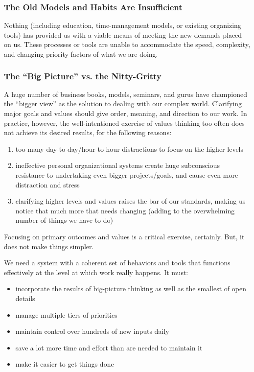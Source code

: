 \documentclass[letterpaper]{article}
\newcommand{\p}{\vspace{1em}\par}		%
\begin{document}
\subsubsection*{The Old Models and Habits Are Insufficient}
Nothing (including education, time-management models, or existing organizing tools) has provided us with a viable means of meeting the new demands placed on us. These processes or tools are unable to accommodate the speed, complexity, and changing priority factors of what we are doing.

\subsubsection*{The ``Big Picture'' vs. the Nitty-Gritty}
A huge number of business books, models, seminars, and gurus have championed the ``bigger view'' as the solution to dealing with our complex world. Clarifying major goals and values should give order, meaning, and direction to our work. In practice, however, the well-intentioned exercise of values thinking too often does not achieve its desired results, for the following reasons:
\begin{enumerate}
\item too many day-to-day/hour-to-hour distractions to focus on the higher levels
\item ineffective personal organizational systems create huge subconscious resistance to undertaking even bigger projects/goals, and cause even more distraction and stress
\item clarifying higher levels and values raises the bar of our standards, making us notice that much more that needs changing (adding to the overwhelming number of things we have to do)
\end{enumerate}
Focusing on primary outcomes and values is a critical exercise, certainly. But, it does not make things simpler. 

\p We need a system with a coherent set of behaviors and tools that functions effectively at the level at which work really happens. It must:
\begin{itemize}
\item incorporate the results of big-picture thinking as well as the smallest of open details
\item manage multiple tiers of priorities
\item maintain control over hundreds of new inputs daily
\item save a lot more time and effort than are needed to maintain it
\item make it easier to get things done
\end{itemize}
\end{document}
